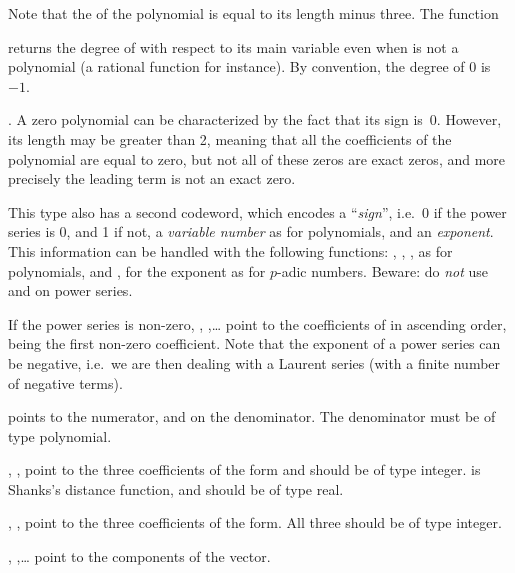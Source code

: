 Note that the  of the polynomial is equal to its length minus
three. The function

 returns the degree of  with respect to its
main variable even when  is not a polynomial (a rational function for
instance). By convention, the degree of $0$ is~$-1$.

. A zero polynomial can be characterized by the
fact that its sign is~0. However, its length may be greater than 2, meaning
that all the coefficients of the polynomial are equal to zero, but not all of
these zeros are exact zeros, and more precisely the leading term
 is not an exact zero.

This type also has a second codeword, which encodes a ``\emph{sign}'', i.e.~0
if the power series is 0, and 1 if not, a \emph{variable number} as for
polynomials, and an \emph{exponent}. This information can be handled with the
following functions: , , , 
as for polynomials, and ,  for the exponent as for
$p$-adic numbers. Beware: do \emph{not} use  and  on
power series.

If the power series is non-zero, , ,\dots
{} point to the coefficients of  in ascending order,
 being the first non-zero coefficient.  Note that the exponent of a
power series can be negative, i.e.~we are then dealing with a Laurent series
(with a finite number of negative terms).

%
  points
to the numerator, and  on the denominator. The denominator must be
of type polynomial.

%
 ,
,  point to the three coefficients of the form and should
be of type integer.  is Shanks's distance function, and should be
of type real.

%
 , ,
 point to the three coefficients of the form. All three should be
of type integer.

%
, ,\dots {} point to the components of the
vector.

